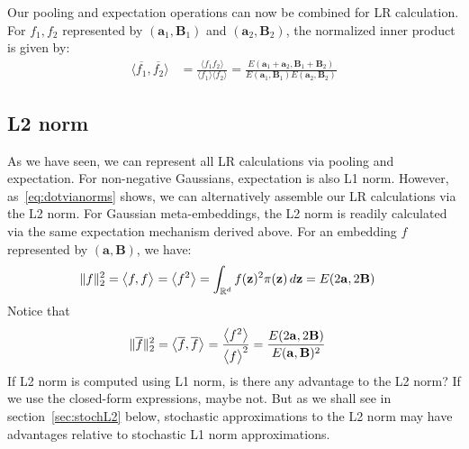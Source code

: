 \documentclass[a4paper,oneside,12pt,english]{report}
\def\zvec{\mathbf{z}}
\def\expv#1#2{\bigl\langle#1\bigr\rangle_{#2}}
\def\expp#1{\bigl\langle#1\bigr\rangle}
\def\R{\mathbb{R}}
\def\Bmat{\mathbf{B}}
\def\Imat{\mathbf{I}}
\def\avec{\mathbf{a}}
\def\dot#1#2{\expv{#1,#2}{}}
\def\normal#1{\overline{#1}}
\def\dotn#1#2{\dot{\normal{#1}}{\normal{#2}}}
\begin{document}
Our pooling and expectation operations can now be combined for LR calculation. For $f_1,f_2$ represented by $(\avec_1,\Bmat_1)$ and $(\avec_2,\Bmat_2)$, the normalized inner product is given by:
\begin{align}
\label{eq:LRMVG}
\dotn{f_1}{f_2} &= \frac{\expp{f_1f_2}}{\expp{f_1}\expp{f_2}} = \frac{E(\avec_1+\avec_2,\Bmat_1+\Bmat_2)}{E(\avec_1,\Bmat_1)E(\avec_2,\Bmat_2)}
\end{align}


\subsection{L2 norm}
As we have seen, we can represent all LR calculations via pooling and expectation. For non-negative Gaussians, expectation is also L1 norm.  However, as~\eqref{eq:dotvianorms} shows, we can alternatively assemble our LR calculations via the L2 norm. For Gaussian meta-embeddings, the L2 norm is readily calculated via the same expectation mechanism derived above. For an embedding $f$ represented by $(\avec,\Bmat)$, we have:
\begin{align}
\norm{f}^2 &= \dot{f}{f} = \expp{f^2} = \int_{\R^d}f(\zvec)^2\pi(\zvec)\,d\zvec = E(2\avec,2\Bmat)
\end{align}  
Notice that 
\begin{align}
\label{eq:MVG_normalL2}
\norm{\normal{f}}^2 &= \dotn{f}{f} = \frac{\expp{f^2}}{\expp{f}^2} = \frac{E(2\avec,2\Bmat)}{E(\avec,\Bmat)^2}
\end{align}  
If L2 norm is computed using L1 norm, is there any advantage to the L2 norm? If we use the closed-form expressions, maybe not. But as we shall see in section~\ref{sec:stochL2} below, stochastic approximations to the L2 norm may have advantages relative to stochastic L1 norm approximations.



\end{document}
